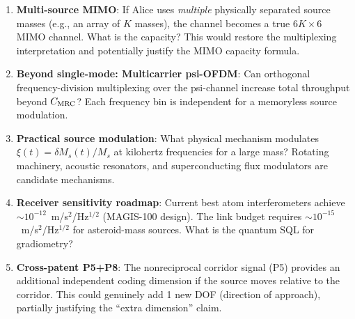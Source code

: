 \documentclass[aps,prd,twocolumn,superscriptaddress,nofootinbib]{revtex4-2}
\begin{document}
\begin{enumerate}
\item \textbf{Multi-source MIMO}: If Alice uses \emph{multiple} physically
  separated source masses (e.g., an array of $K$ masses), the channel
  becomes a true $6K \times 6$ MIMO channel. What is the capacity?
  This would restore the multiplexing interpretation and potentially
  justify the MIMO capacity formula.

\item \textbf{Beyond single-mode: Multicarrier psi-OFDM}: Can orthogonal
  frequency-division multiplexing over the psi-channel increase total
  throughput beyond $C_{\rm MRC}$? Each frequency bin is independent
  for a memoryless source modulation.

\item \textbf{Practical source modulation}: What physical mechanism modulates
  $\xi(t) = \delta M_s(t)/M_s$ at kilohertz frequencies for a large mass?
  Rotating machinery, acoustic resonators, and superconducting flux
  modulators are candidate mechanisms.

\item \textbf{Receiver sensitivity roadmap}: Current best atom interferometers
  achieve $\sim 10^{-12}$~m/s$^2$/Hz$^{1/2}$ (MAGIS-100 design). The link
  budget requires $\sim 10^{-15}$~m/s$^2$/Hz$^{1/2}$ for asteroid-mass
  sources. What is the quantum SQL for gradiometry?

\item \textbf{Cross-patent P5+P8}: The nonreciprocal corridor signal (P5)
  provides an additional independent coding dimension if the source moves
  relative to the corridor. This could genuinely add 1 new DOF (direction
  of approach), partially justifying the ``extra dimension'' claim.
\end{enumerate}

\end{document}

